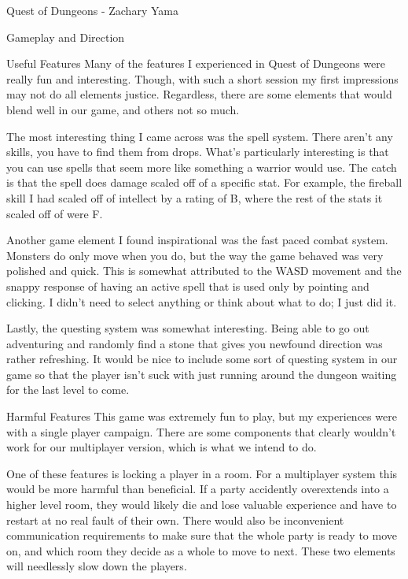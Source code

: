 \documentclass[12pt]{report}
\begin{document}
\begin{section}{Quest of Dungeons - Zachary Yama}
\begin{subsection}{Gameplay and Direction}
\end{subsection}
 
\begin{subsection}{Useful Features}
Many of the features I experienced in Quest of Dungeons were really fun and interesting. Though, 
with such a short session my first impressions may not do all elements justice. Regardless, there 
are some elements that would blend well in our game, and others not so much.
 
The most interesting thing I came across was the spell system. There aren’t any skills, you have 
to find them from drops. What’s particularly interesting is that you can use spells that seem more 
like something a warrior would use. The catch is that the spell does damage scaled off of a specific 
stat. For example, the fireball skill I had scaled off of intellect by a rating of B, where the rest 
of the stats it scaled off of were F.
 
Another game element I found inspirational was the fast paced combat system. Monsters do only move 
when you do, but the way the game behaved was very polished and quick. This is somewhat attributed 
to the WASD movement and the snappy response of having an active spell that is used only by pointing 
and clicking. I didn’t need to select anything or think about what to do; I just did it.

Lastly, the questing system was somewhat interesting. Being able to go out adventuring and randomly 
find a stone that gives you newfound direction was rather refreshing. It would be nice to include some
sort of questing system in our game so that the player isn’t suck with just running around the dungeon 
waiting for the last level to come.  
 
\end{subsection}
 
\begin{subsection}{Harmful Features}
This game was extremely fun to play, but my experiences were with a single player campaign. There are 
some components that clearly wouldn’t work for our multiplayer version, which is what we intend to do.
 
One of these features is locking a player in a room. For a multiplayer system this would be more harmful 
than beneficial. If a party accidently overextends into a higher level room, they would likely die and 
lose valuable experience and have to restart at no real fault of their own. There would also be 
inconvenient communication requirements to make sure that the whole party is ready to move on, 
and which room they decide as a whole to move to next. These two elements will needlessly slow down 
the players.
 

\end{subsection}
\end{section}
\end{document}
